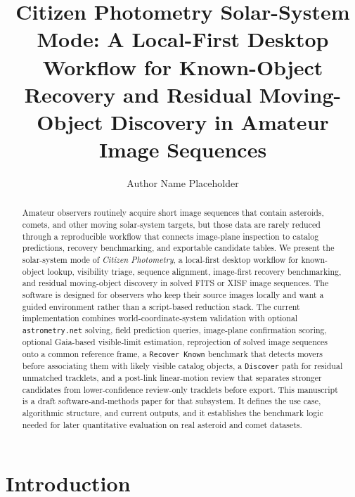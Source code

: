 \documentclass[modern]{aastex701}
\begin{document}
\title{Citizen Photometry Solar-System Mode: A Local-First Desktop Workflow for Known-Object Recovery and Residual Moving-Object Discovery in Amateur Image Sequences}


\author{Author Name Placeholder}

\begin{abstract}
Amateur observers routinely acquire short image sequences that contain asteroids, comets, and other moving solar-system targets, but those data are rarely reduced through a reproducible workflow that connects image-plane inspection to catalog predictions, recovery benchmarking, and exportable candidate tables. We present the solar-system mode of \emph{Citizen Photometry}, a local-first desktop workflow for known-object lookup, visibility triage, sequence alignment, image-first recovery benchmarking, and residual moving-object discovery in solved FITS or XISF image sequences. The software is designed for observers who keep their source images locally and want a guided environment rather than a script-based reduction stack. The current implementation combines world-coordinate-system validation with optional \texttt{astrometry.net} solving, field prediction queries, image-plane confirmation scoring, optional Gaia-based visible-limit estimation, reprojection of solved image sequences onto a common reference frame, a \texttt{Recover Known} benchmark that detects movers before associating them with likely visible catalog objects, a \texttt{Discover} path for residual unmatched tracklets, and a post-link linear-motion review that separates stronger candidates from lower-confidence review-only tracklets before export. This manuscript is a draft software-and-methods paper for that subsystem. It defines the use case, algorithmic structure, and current outputs, and it establishes the benchmark logic needed for later quantitative evaluation on real asteroid and comet datasets.
\end{abstract}


\section{Introduction}\label{sec:introduction}
\end{document}
